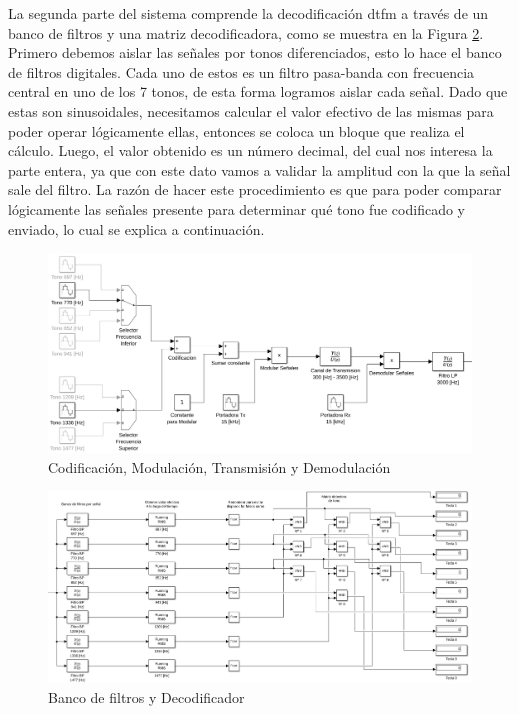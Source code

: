 La segunda parte del sistema comprende la decodificación \gls{dtfm} a través de un banco de filtros y una matriz decodificadora, como se muestra en la Figura \ref{fig:bloques_codec}. Primero debemos aislar las señales por tonos diferenciados, esto lo hace el banco de filtros digitales. Cada uno de estos es un filtro pasa-banda con frecuencia central en uno de los 7 tonos, de esta forma logramos aislar cada señal. Dado que estas son sinusoidales, necesitamos calcular el valor efectivo de las mismas para poder operar lógicamente ellas, entonces se coloca un bloque que realiza el cálculo. Luego, el valor obtenido es un número decimal, del cual nos interesa la parte entera, ya que con este dato vamos a validar la amplitud con la que la señal sale del filtro. La razón de hacer este procedimiento es que para poder comparar lógicamente las señales presente para determinar qué tono fue codificado y enviado, lo cual se explica a continuación.

\begin{figure}[H]
  \centering
  \includegraphics[width=\linewidth]{images/desarrollo/modem.png}
  \caption{Codificación, Modulación, Transmisión y Demodulación}
  \label{fig:bloques_modem}
\end{figure}

\begin{figure}[H]
  \centering
  \includegraphics[width=\linewidth]{images/desarrollo/codec.png}
  \caption{Banco de filtros y Decodificador}
  \label{fig:bloques_codec}
\end{figure}

